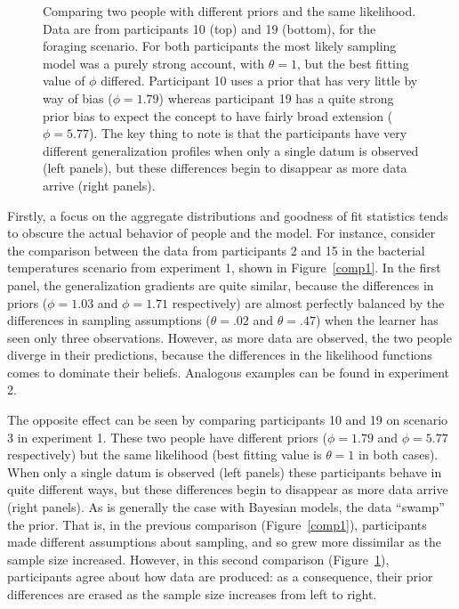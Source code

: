 \documentclass[doc]{apa6}
\begin{document}
\begin{figure}[t]
\begin{center}
\caption{Comparing two people with different priors and the same likelihood. Data are from participants 10 (top) and 19 (bottom), for the foraging scenario. For both participants the most likely sampling model was a purely strong account, with $\theta = 1$, but the best fitting value of $\phi$ differed. Participant 10 uses a prior that has very little by way of bias ($\phi = 1.79$) whereas participant 19 has a quite strong prior bias to expect the concept to have fairly broad extension ($\phi = 5.77$). The key thing to note is that the participants have very different generalization profiles when only a single datum is observed (left panels), but these differences begin to disappear as more data arrive (right panels).}
\label{comp2}
\end{center}
\end{figure}




Firstly, a focus on the aggregate distributions and goodness of fit statistics tends to obscure the actual behavior of people and the model. For instance, consider the comparison between the data from participants 2 and 15 in the bacterial temperatures scenario from experiment 1, shown in Figure~\ref{comp1}. In the first panel, the generalization gradients are quite similar, because the differences in priors ($\phi = 1.03$ and $\phi = 1.71$ respectively) are almost perfectly balanced by the differences in sampling assumptions ($\theta = .02$ and $\theta = .47$) when the learner has seen only three observations. However, as more data are observed, the two people diverge in their predictions, because the differences in the likelihood functions comes to dominate their beliefs. Analogous examples can be found in experiment 2.

The opposite effect can be seen by comparing participants 10 and 19 on scenario 3 in experiment 1. These two people have different priors ($\phi =1.79$ and $\phi = 5.77$ respectively) but the same likelihood (best fitting value is $\theta =1$ in both cases). When only a single datum is observed (left panels) these participants behave in quite different ways, but these differences begin to disappear as more data arrive (right panels). As is generally the case with Bayesian models, the data ``swamp'' the prior. That is, in the previous comparison (Figure~\ref{comp1}), participants made different assumptions about sampling, and so grew more dissimilar as the sample size increased. However, in this second comparison (Figure~\ref{comp2}), participants agree about how data are produced: as a consequence, their prior differences are erased as the sample size increases from left to right.
\end{document}
